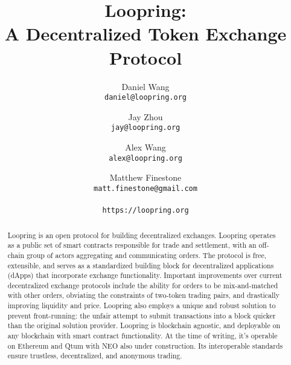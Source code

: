 \documentclass[UTF8,nofonts]{article}
\title{\textbf{Loopring:}\\\textbf{A Decentralized Token Exchange Protocol}}
\author{
  Daniel Wang\\
  \texttt{daniel@loopring.org}\\
  \and
  	Jay Zhou\\
  	\texttt{jay@loopring.org}\\
  	\and
  	Alex Wang\\
  	\texttt{alex@loopring.org}\\
  	\and
  	Matthew Finestone\\
  	\texttt{matt.finestone@gmail.com}\\ 
  \\
  \texttt{https://loopring.org}
 }
\begin{document}
\maketitle


\begin{abstract}
Loopring is an open protocol for building decentralized exchanges. Loopring operates as a public set of smart contracts responsible for trade and settlement, with an off-chain group of actors aggregating and communicating orders. The protocol is free, extensible, and serves as a standardized building block for decentralized applications (dApps) that incorporate exchange functionality. Important improvements over current decentralized exchange protocols include the ability for orders to be mix-and-matched with other orders, obviating the constraints of two-token trading pairs, and drastically improving liquidity and price. Loopring also employs a unique and robust solution to prevent front-running: the unfair attempt to submit transactions into a block quicker than the original solution provider. Loopring is blockchain agnostic, and deployable on any blockchain with smart contract functionality. At the time of writing, it's operable on Ethereum \cite{buterin2017ethereum} \cite{wood2014ethereum} and Qtum \cite{dai2017smart} with NEO \cite{atterlonn2018distributed} also under construction. Its interoperable standards ensure trustless, decentralized, and anonymous trading.
\end{abstract}
\end{document}
